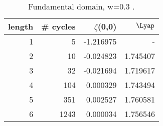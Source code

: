 {  %
%
\begin{table}
{\small
\begin{tabular}{|r|r|r|r|}
\hline
length & \# cycles & $\zeta$(0,0) & $\Lyap$ \\ \hline\hline
1      &    5     &  -1.216975 &     -    \\
2      &   10     &  -0.024823 & 1.745407 \\
3      &   32     &  -0.021694 & 1.719617 \\
4      &  104     &   0.000329 & 1.743494 \\
5      &  351     &   0.002527 & 1.760581 \\
6      & 1243     &   0.000034 & 1.756546 \\ \hline
\end{tabular}
\caption[]{\small
Fundamental domain, w=0.3 .
}
\label{t-diff-5a}
}  %
\end{table}
%
%



}
